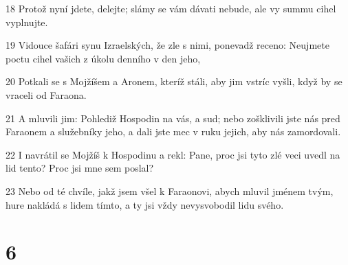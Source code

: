 \par 18 Protož nyní jdete, delejte; slámy se vám dávati nebude, ale vy summu cihel vyplnujte.
\par 19 Vidouce šafári synu Izraelských, že zle s nimi, ponevadž receno: Neujmete poctu cihel vašich z úkolu denního v den jeho,
\par 20 Potkali se s Mojžíšem a Aronem, kteríž stáli, aby jim vstríc vyšli, když by se vraceli od Faraona.
\par 21 A mluvili jim: Pohlediž Hospodin na vás, a sud; nebo zošklivili jste nás pred Faraonem a služebníky jeho, a dali jste mec v ruku jejich, aby nás zamordovali.
\par 22 I navrátil se Mojžíš k Hospodinu a rekl: Pane, proc jsi tyto zlé veci uvedl na lid tento? Proc jsi mne sem poslal?
\par 23 Nebo od té chvíle, jakž jsem všel k Faraonovi, abych mluvil jménem tvým, hure nakládá s lidem tímto, a ty jsi vždy nevysvobodil lidu svého.

\chapter{6}

